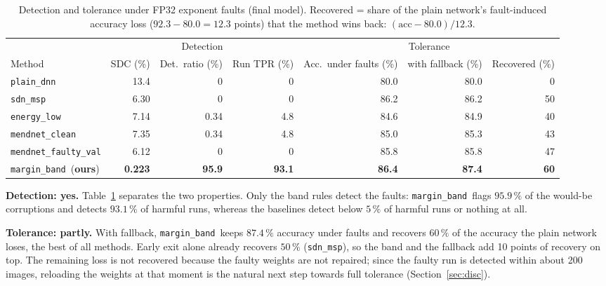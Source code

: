 \documentclass[10pt,a4paper]{article}
\newcommand{\meth}[1]{\texttt{#1}}
\newcommand{\ours}{\meth{margin\_band}}
\begin{document}
\begin{table}[H]
\centering\small
\caption{Detection and tolerance under FP32 exponent faults (final model). Recovered = share of the plain network's
fault-induced accuracy loss ($92.3-80.0=12.3$ points) that the method wins back: $(\text{acc}-80.0)/12.3$.}
\label{tab:tolerance}
\begin{adjustbox}{max width=\linewidth}
\begin{tabular}{@{}lrrrrrr@{}}
\toprule
 & \multicolumn{3}{c}{Detection} & \multicolumn{3}{c}{Tolerance} \\
\cmidrule(lr){2-4}\cmidrule(l){5-7}
Method & SDC (\%) & Det.\ ratio (\%) & Run TPR (\%) & Acc.\ under faults (\%) & with fallback (\%) & Recovered (\%) \\
\midrule
\meth{plain\_dnn}      & 13.4  & 0    & 0    & 80.0 & 80.0 & 0 \\
\meth{sdn\_msp}        & 6.30  & 0    & 0    & 86.2 & 86.2 & 50 \\
\meth{energy\_low}     & 7.14  & 0.34 & 4.8  & 84.6 & 84.9 & 40 \\
\meth{mendnet\_clean}  & 7.35  & 0.34 & 4.8  & 85.0 & 85.3 & 43 \\
\meth{mendnet\_faulty\_val} & 6.12 & 0 & 0  & 85.8 & 85.8 & 47 \\
\midrule
\ours\ (\textbf{ours}) & \textbf{0.223} & \textbf{95.9} & \textbf{93.1} & \textbf{86.4} & \textbf{87.4} & \textbf{60} \\
\bottomrule
\end{tabular}
\end{adjustbox}
\end{table}

\textbf{Detection: yes.} Table~\ref{tab:tolerance} separates the two properties. Only the band rules detect the
faults: \ours\ flags $95.9\,\%$ of the would-be corruptions and detects $93.1\,\%$ of harmful runs, whereas the
baselines detect below $5\,\%$ of harmful runs or nothing at all.

\textbf{Tolerance: partly.} With fallback, \ours\ keeps $87.4\,\%$ accuracy under faults and recovers $60\,\%$ of the
accuracy the plain network loses, the best of all methods. Early exit alone already recovers $50\,\%$
(\meth{sdn\_msp}), so the band and the fallback add 10 points of recovery on top. The remaining loss is not
recovered because the faulty weights are not repaired; since the faulty run is detected within about 200 images,
reloading the weights at that moment is the natural next step towards full tolerance (Section~\ref{sec:disc}).
\end{document}

